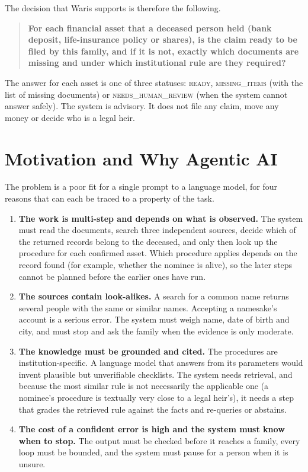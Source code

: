 \documentclass[12pt,a4paper,oneside]{report}
\begin{document}
The decision that Waris supports is therefore the following.

\begin{quote}
\textbf{For each financial asset that a deceased person held (bank deposit, life-insurance policy or shares), is the claim ready to be filed by this family, and if it is not, exactly which documents are missing and under which institutional rule are they required?}
\end{quote}

The answer for each asset is one of three statuses: \textsc{ready}, \textsc{missing\_items} (with the list of missing documents) or \textsc{needs\_human\_review} (when the system cannot answer safely). The system is advisory. It does not file any claim, move any money or decide who is a legal heir.

\section{Motivation and Why Agentic AI}
The problem is a poor fit for a single prompt to a language model, for four reasons that can each be traced to a property of the task.

\begin{enumerate}[leftmargin=*,itemsep=2pt]
\item \textbf{The work is multi-step and depends on what is observed.} The system must read the documents, search three independent sources, decide which of the returned records belong to the deceased, and only then look up the procedure for each confirmed asset. Which procedure applies depends on the record found (for example, whether the nominee is alive), so the later steps cannot be planned before the earlier ones have run.
\item \textbf{The sources contain look-alikes.} A search for a common name returns several people with the same or similar names. Accepting a namesake's account is a serious error. The system must weigh name, date of birth and city, and must stop and ask the family when the evidence is only moderate.
\item \textbf{The knowledge must be grounded and cited.} The procedures are institution-specific. A language model that answers from its parameters would invent plausible but unverifiable checklists. The system needs retrieval, and because the most similar rule is not necessarily the applicable one (a nominee's procedure is textually very close to a legal heir's), it needs a step that grades the retrieved rule against the facts and re-queries or abstains.
\item \textbf{The cost of a confident error is high and the system must know when to stop.} The output must be checked before it reaches a family, every loop must be bounded, and the system must pause for a person when it is unsure.
\end{enumerate}
\end{document}
